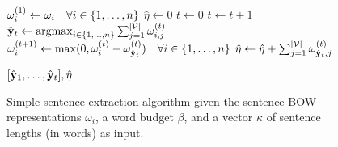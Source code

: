 
\begin{figure}
  \begin{algorithmic}[1]
   
      \State $\omega_i^{(1)}  \gets \omega_i \quad \forall i \in \{1, \ldots, n\}$
      \State $\hat{\eta} \gets 0$
      \State $t \gets 0$
        \State $t \gets t + 1$
        \State $\hat{\mathbf{y}}_t \gets \operatorname{arg max}_{i \in \{1,\ldots, n\}}
            \sum_{j=1}^{|\mathcal{V}|} \omega^{(t)}_{i,j}$
            \State $\omega_i^{(t+1)} \gets \max(0, \omega_i^{(t)} - \omega^{(t)}_{\hat{\mathbf{y}}_t} )\quad  \forall i \in \{1, \ldots, n \}$
        \State $\hat{\eta} \gets \hat{\eta} + \sum_{j=1}^{|\mathcal{V}|} \omega_{\hat{\mathbf{y}}_t,j}^{(t)}$
         

      \EndWhile
        \State \Return $[\hat{\mathbf{y}}_1,\ldots,\hat{\mathbf{y}}_t], \hat{\eta}$ 
    \EndProcedure
  \end{algorithmic}
\caption{Simple sentence extraction algorithm given
 the sentence BOW representations $\omega_i$, 
  a word budget $\beta$, and a vector $\kappa$ of sentence lengths (in words)
  as input.}
\label{alg:wimp_ext_alg}
\end{figure}
